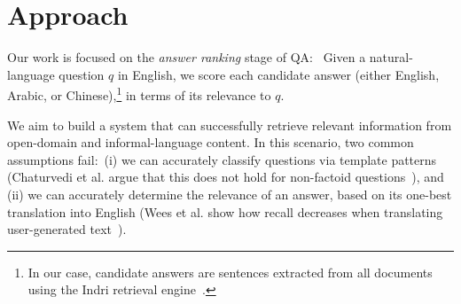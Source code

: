 \documentclass{sig-alternate-05-2015}
\newcommand{\ignore}[1]{}
\begin{document}



\section{Approach}\label{sec:main}


Our work is focused on the \emph{answer ranking} stage of QA:\
Given a natural-language question $q$ in English, we score each candidate answer (either English, Arabic, or 
Chinese),\footnote{In our case, candidate answers are sentences extracted from all documents 
using the Indri retrieval engine~\cite{Metzler:2005}.} in terms of its relevance to $q$. 

\ignore{Our approach is not limited to any question type, factoid or non-factoid. Our main motivation is to provide good QA quality on
any multilingual Web collection. This entails finding answers to questions where there is no single answer, and for which human 
agreement is low.}

We aim to build a system that can successfully retrieve relevant information from open-domain and 
informal-language content. In this scenario, two common assumptions fail:\ (i) we can accurately classify questions via template 
patterns (Chaturvedi et al. argue that this does not hold for non-factoid questions~\cite{Chaturvedi:2014aa}),
and (ii) we can accurately determine the relevance of an answer, based on its one-best translation into English (Wees et al. 
show how recall decreases when translating user-generated text~\cite{Wees:2015aa}).
\end{document}
